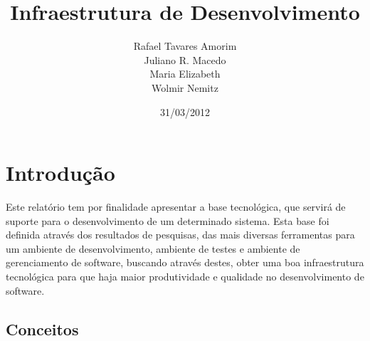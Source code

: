 \documentclass[12pt,a4paper]{article}
\begin{document}
\title{Infraestrutura de Desenvolvimento}

\vspace{5cm}

\author{
Rafael Tavares Amorim \\
Juliano R. Macedo \\
Maria Elizabeth \\
Wolmir Nemitz
}

\vspace{10cm}

\date{31/03/2012}
\maketitle
\thispagestyle{empty}
\clearpage
\tableofcontents
\thispagestyle{empty}
\clearpage

\section{Introdução}

	Este relatório tem por finalidade apresentar a base tecnológica, que servirá de suporte para o desenvolvimento de um determinado sistema. 
	Esta base foi definida através dos resultados de pesquisas, das mais diversas ferramentas para um ambiente de desenvolvimento, 
	ambiente de testes e ambiente de gerenciamento de software, buscando através destes, 
	obter uma boa infraestrutura tecnológica para que haja maior produtividade e qualidade no desenvolvimento de software.

	\subsection{Conceitos}
	
\end{document}
